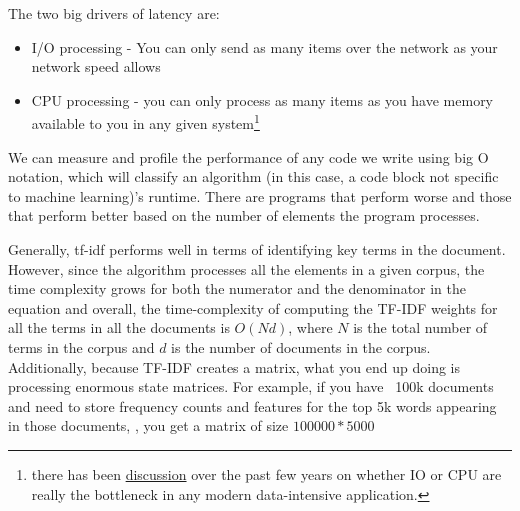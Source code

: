 \documentclass[draft, 11pt]{diazessay} %
\begin{document}

The two big drivers of latency are: 

\begin{itemize}
  \item I/O processing - You can only send as many items over the network as your network speed allows
  \item CPU processing - you can only process as many items as you have memory available to you in any given system\footnote{there has been \href{https://benhoyt.com/writings/io-is-no-longer-the-bottleneck/}{discussion} over the past few years on whether IO or CPU are really the bottleneck in any modern data-intensive application.}
\end{itemize}

We can measure and profile the performance of any code we write using big O notation, which will classify an algorithm (in this case, a code block not specific to machine learning)'s runtime.  There are programs that perform worse and those that perform better based on the number of elements the program processes. 

Generally, tf-idf performs well in terms of identifying key terms in the document. However, since the algorithm processes all the elements in a given corpus, the time complexity grows for both the numerator and the denominator in the equation and overall, the time-complexity of computing the TF-IDF weights for all the terms in all the documents is $O(Nd)$, where $N$ is the total number of terms in the corpus and $d$ is the number of documents in the corpus. Additionally, because TF-IDF creates a matrix, what you end up doing is processing enormous state matrices. For example, if you have ~100k documents and need to store frequency counts and features for the top 5k words appearing in those documents, , you get a matrix of size $100000*5000$
\end{document}
